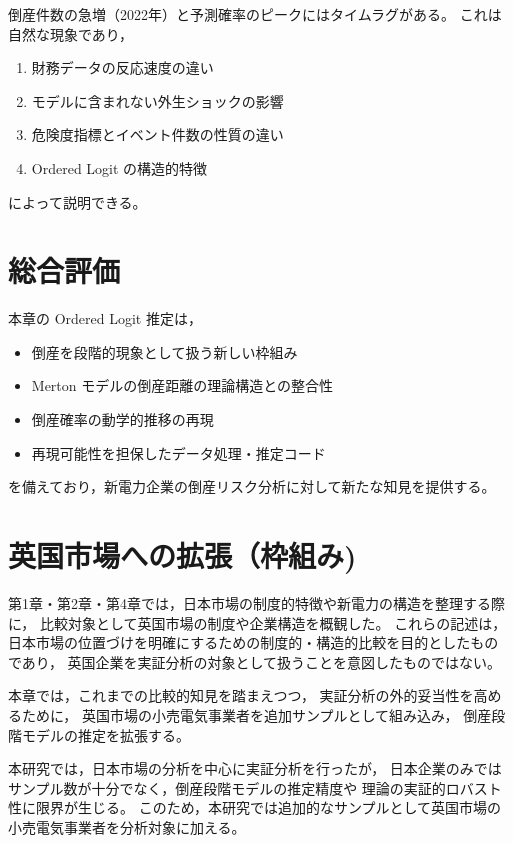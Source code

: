 倒産件数の急増（2022年）と予測確率のピークにはタイムラグがある。
これは自然な現象であり，

\begin{enumerate}
    \item 財務データの反応速度の違い
    \item モデルに含まれない外生ショックの影響
    \item 危険度指標とイベント件数の性質の違い
    \item Ordered Logit の構造的特徴
\end{enumerate}

によって説明できる。

\section{総合評価}
\label{sec:conclusion}

本章の Ordered Logit 推定は，

\begin{itemize}
    \item 倒産を段階的現象として扱う新しい枠組み
    \item Merton モデルの倒産距離の理論構造との整合性
    \item 倒産確率の動学的推移の再現
    \item 再現可能性を担保したデータ処理・推定コード
\end{itemize}

を備えており，新電力企業の倒産リスク分析に対して新たな知見を提供する。

\section{英国市場への拡張（枠組み)}
\label{sec:uk_extension}

第1章・第2章・第4章では，日本市場の制度的特徴や新電力の構造を整理する際に，
比較対象として英国市場の制度や企業構造を概観した。
これらの記述は，日本市場の位置づけを明確にするための制度的・構造的比較を目的としたものであり，
英国企業を実証分析の対象として扱うことを意図したものではない。

本章では，これまでの比較的知見を踏まえつつ，
実証分析の外的妥当性を高めるために，
英国市場の小売電気事業者を追加サンプルとして組み込み，
倒産段階モデルの推定を拡張する。

本研究では，日本市場の分析を中心に実証分析を行ったが，
日本企業のみではサンプル数が十分でなく，倒産段階モデルの推定精度や
理論の実証的ロバスト性に限界が生じる。
このため，本研究では追加的なサンプルとして英国市場の小売電気事業者を分析対象に加える。

